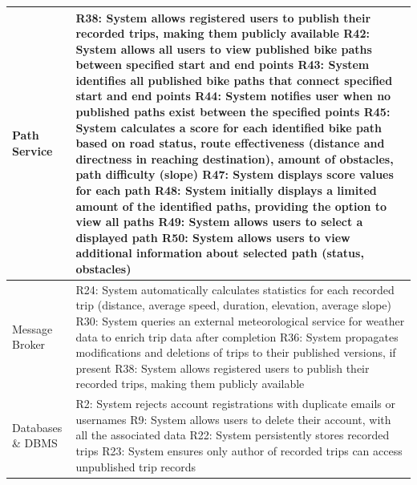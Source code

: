\begin{longtable}{|p{3cm}|p{13cm}|}
   Path Service & 
   R38: System allows registered users to publish their recorded trips, making them publicly available \newline
   R42: System allows all users to view published bike paths between specified start and end points \newline
   R43: System identifies all published bike paths that connect specified start and end points \newline
   R44: System notifies user when no published paths exist between the specified points \newline
   R45: System calculates a score for each identified bike path based on road status, route effectiveness (distance and directness in reaching destination), amount of obstacles, path difficulty (slope) \newline
   R47: System displays score values for each path \newline
   R48: System initially displays a limited amount of the identified paths, providing the option to view all paths \newline
   R49: System allows users to select a displayed path \newline
   R50: System allows users to view additional information about selected path (status, obstacles) \\ \hline
   Message Broker & 
   R24: System automatically calculates statistics for each recorded trip (distance, average speed, duration, elevation, average slope) \newline
   R30: System queries an external meteorological service for weather data to enrich trip data after completion \newline
   R36: System propagates modifications and deletions of trips to their published versions, if present \newline
   R38: System allows registered users to publish their recorded trips, making them publicly available \\ \hline
   Databases \newline \& DBMS & 
   R2: System rejects account registrations with duplicate emails or usernames \newline
   R9: System allows users to delete their account, with all the associated data \newline
   R22: System persistently stores recorded trips \newline
   R23: System ensures only author of recorded trips can access unpublished trip records \newline

\end{longtable}
